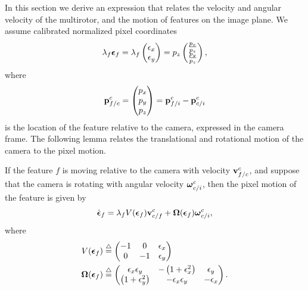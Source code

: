 In this section we derive an expression that relates the velocity and angular velocity of the multirotor, and the motion of features on the image plane.
%
We assume calibrated normalized pixel coordinates
\[
\lambda_f \boldsymbol{\epsilon}_f = \lambda_f \begin{pmatrix}\epsilon_x \\ \epsilon_y\end{pmatrix} = p_z \begin{pmatrix} \frac{p_x}{p_z} \\ \frac{p_y}{p_z} \end{pmatrix},
\]
where
\[
\mathbf{p}_{f/c}^c = \begin{pmatrix} p_x \\ p_y \\ p_z \end{pmatrix}=\mathbf{p}_{f/i}^c - \mathbf{p}_{c/i}^c
\]
is the location of the feature relative to the camera, expressed in the camera frame. 
%
The following lemma relates the translational and rotational motion of the camera to the pixel motion.
\begin{lemma}
	If the feature $f$ is moving relative to the camera with velocity $\mathbf{v}_{f/c}^c$, and suppose that the camera is rotating with angular velocity $\boldsymbol{\omega}_{c/i}^c$, then the pixel motion of the feature is given by
	\begin{equation}\label{eq:optic_flow}
	\dot{\epsilonbf}_f = \lambda_f V(\epsilonbf_f)\vbf_{c/f}^c + \boldsymbol{\Omega}(\epsilonbf_f)\omegabf_{c/i}^c,
	\end{equation}
	where 
	\begin{align}
	V(\epsilonbf_f) &\defeq 	\begin{pmatrix} 
	-1 & 0 & \epsilon_x \\
	0 & -1 & \epsilon_y 
	\end{pmatrix} \label{eq:V(epsilon)}\\
	\boldsymbol{\Omega}(\epsilonbf_f) &\defeq \begin{pmatrix}
	\epsilon_x\epsilon_y & -\left(1 + \epsilon_x^2\right) & \epsilon_y \\
	\left(1 + \epsilon_y^2\right) & -\epsilon_x\epsilon_y & -\epsilon_x
	\end{pmatrix}.
	\label{eq:Omega(epsilon)}
	\end{align}
\end{lemma}
